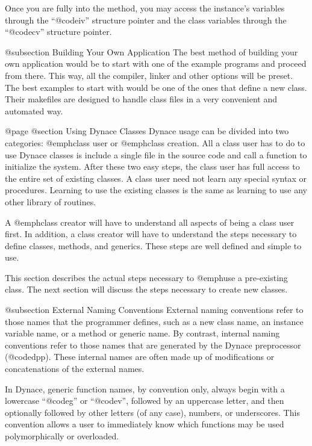 Once you are fully into the method, you may access the instance's
variables through the ``@code{iv}'' structure pointer and the
class variables through the ``@code{cv}'' structure pointer.



@subsection Building Your Own Application
The best method of building your own application would be to start
with one of the example programs and proceed from there.  This way,
all the compiler, linker and other options will be preset.  The best
examples to start with would be one of the ones that define a new
class.  Their makefiles are designed to handle class files in
a very convenient and automated way.


@page
@section Using Dynace Classes
Dynace usage can be divided into two categories: @emph{class user} or
@emph{class creation}.  All a class user has to do to use Dynace classes
is include a single file in the source code and call a function to
initialize the system.  After these two easy steps, the class user has full
access to the entire set of existing classes.  A class user need not learn
any special syntax or procedures.  Learning to use the existing classes
is the same as learning to use any other library of routines.

A @emph{class creator} will have to understand all aspects of being a
class user first.  In addition, a class creator will have to understand
the steps necessary to define classes, methods, and generics.  These
steps are well defined and simple to use.

This section describes the actual steps necessary to @emph{use} a
pre-existing class.  The next section will discuss the steps necessary
to create new classes.

@subsection External Naming Conventions
External naming conventions refer to those names that the programmer
defines, such as a new class name, an instance variable name, or a method
or generic name.  By contrast, internal naming conventions refer to
those names that are generated by the Dynace preprocessor (@code{dpp}).
These internal names are often made up of modifications or
concatenations of the external names.

In Dynace, generic function names, by convention only, always begin with
a lowercase ``@code{g}'' or ``@code{v}'', followed by an uppercase
letter, and then optionally followed by other letters (of any case),
numbers, or underscores.  This convention allows a user to immediately
know which functions may be used polymorphically or overloaded.

